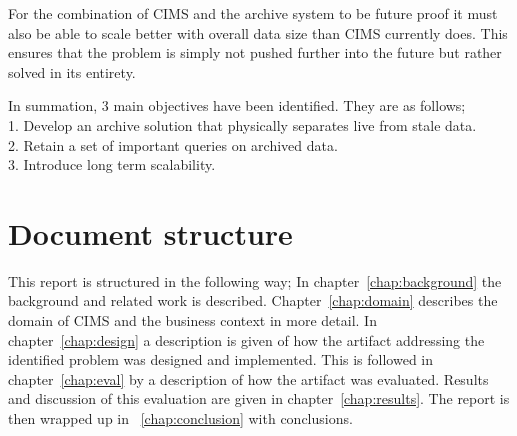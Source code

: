 For the combination of CIMS and the archive system to be future proof it must also be able to scale better with overall data size than CIMS currently does. This ensures that the problem is simply not pushed further into the future but rather solved in its entirety.

In summation, 3 main objectives have been identified. They are as follows;\\
1. Develop an archive solution that physically separates live from stale data.\\
2. Retain a set of important queries on archived data.\\
3. Introduce long term scalability. \\


\section{Document structure}
This report is structured in the following way; In chapter~\ref{chap:background} the background and related work is described. Chapter~\ref{chap:domain} describes the domain of CIMS and the business context in more detail. In chapter~\ref{chap:design} a description is given of how the artifact addressing the identified problem was designed and implemented.
This is followed in chapter~\ref{chap:eval} by a description of how the artifact was evaluated. Results and discussion of this evaluation are given in chapter~\ref{chap:results}. The report is then wrapped up in ~\ref{chap:conclusion} with conclusions.



